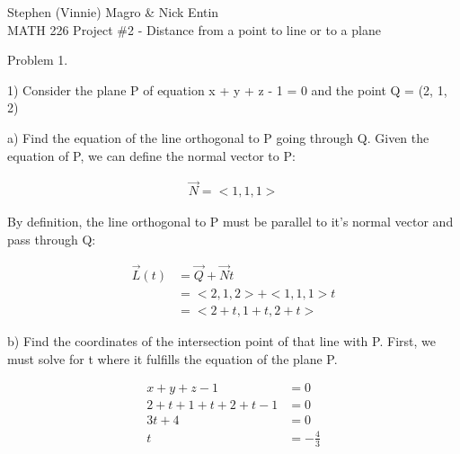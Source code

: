 \documentclass{article}
\begin{document}
\begin{text}
Stephen (Vinnie) Magro \& Nick Entin \\
\indent MATH 226 Project \#2 - Distance from a point to line or to a plane \\
\newline
\newline
\end{text}
\begin{text}
Problem 1. \\
\end{text}

\begin{text}
1) Consider the plane P of equation x + y + z - 1 = 0 and the point Q = (2, 1, 2)
\newline
\end{text}

\begin{text}
\indent a) Find the equation of the line orthogonal to P going through Q.
\newline\newline
\indent\indent\indent Given the equation of P, we can define the normal vector to P:
\end{text}

\begin{align*}
\vec{N}=<1,1,1>
\end{align*}

\begin{text}
\indent\indent By definition, the line orthogonal to P must be parallel to it's normal vector and pass through Q:
\end{text}

\begin{align*}
\vec{L}(t) &= \vec{Q} + \vec{N}t \\
           &= < 2, 1, 2 > + < 1, 1, 1 >t \\
           &= < 2 + t, 1 + t, 2 + t >
\end{align*}

\begin{text}
\indent b) Find the coordinates of the intersection point of that line with P.
\newline\newline
\indent\indent\indent First, we must solve for t where it fulfills the equation of the plane P.
\end{text}

\begin{align*}
x + y + z - 1 &= 0 \\
2 + t + 1 + t + 2 + t -1 &= 0 \\
3t + 4 &= 0 \\
t &= -\frac{4}{3}
\end {align*}
\end{document}
